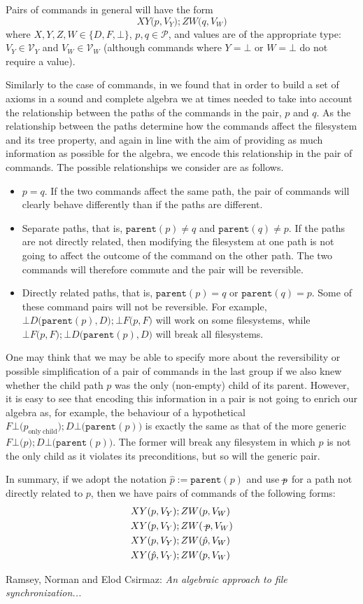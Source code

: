 \documentclass[12pt]{article}
\newcommand{\setvx}[1]{\mathcal{V}_{#1}}
\newcommand{\setp}{\mathcal{P}}
\newcommand{\empt}{\bot}
\newcommand{\parent}{\mathtt{parent}}
\newcommand{\pp}{\hat{p}} %
\newcommand{\np}{\mathrel{\ooalign{$p$\cr\hidewidth\hbox{$-$}\cr}}} %
\newcommand{\fscommand}[2]{{#1#2}}
\newcommand{\cbf}{\fscommand{\empt{F}}}
\newcommand{\cbd}{\fscommand{\empt{D}}}
\newcommand{\cfb}{\fscommand{F\empt}}
\newcommand{\cdb}{\fscommand{D\empt}}
\newcommand{\cxy}{\fscommand{XY}}
\newcommand{\czw}{\fscommand{ZW}}
\begin{document}
Pairs of commands in general will have the form
\[ \cxy(p,V_Y); \czw(q,V_W) \]
where $X,Y,Z,W\in\{D,F,\empt\}$, $p,q\in\setp$, and values are of the appropriate type: 
$V_Y\in\setvx{Y}$ and $V_W\in\setvx{W}$
(although commands where $Y=\empt$ or $W=\empt$ do not require a value).

Similarly to the case of commands, in \cite{NREC:alg} we found that in order to build
a set of axioms in a sound and complete algebra we at times needed to take into account
the relationship between the paths of the commands in the pair, $p$ and $q$.
As the relationship between the paths determine how the commands affect the filesystem
and its tree property, 
and again in line with the aim of providing as much information as possible for the algebra,
we encode this relationship in the pair of commands. The possible relationships we
consider are as follows.

\begin{itemize}
\item $p=q$. If the two commands affect the same path, the pair of commands
will clearly behave differently than if the paths are different.
\item Separate paths, that is, $\parent(p)\neq q$ and $\parent(q)\neq p$. If the paths
are not directly related, then modifying the filesystem at one path is not going
to affect the outcome of the command on the other path.
The two commands will therefore commute and the pair will be reversible.
\item Directly related paths, that is, $\parent(p)=q$ or $\parent(q)=p$.
Some of these command pairs will not be reversible.
For example, $\cbd(\parent(p),D);\cbf(p,F)$ will work on some filesystems,
while $\cbf(p,F);\cbd(\parent(p),D)$ will break all filesystems.
\end{itemize}

One may think that we may be able to specify more about the reversibility
or possible simplification of a pair of commands in the last group if we also
knew whether the child path $p$ was the only (non-empty) child of its parent.
However, it is easy to see that encoding this information in a pair
is not going to enrich our algebra as, for example,
the behaviour of a hypothetical $\cfb(p_{\mathrm{only\ child}}); \cdb(\parent(p))$
is exactly the same as that of the more generic
$\cfb(p); \cdb(\parent(p))$. The former will break any filesystem in which
$p$ is not the only child as it violates its preconditions, but so will
the generic pair.

In summary, if we adopt the notation $\pp := \parent(p)$ and use $\np$ for a path not directly related to $p$,
then we have pairs of commands
of the following forms:
\begin{align*}
\cxy(p,V_Y)&; \czw(p,V_W) \\
\cxy(p,V_Y)&; \czw(\np,V_W) \\
\cxy(p,V_Y)&; \czw(\pp,V_W) \\
\cxy(\pp,V_Y)&; \czw(p,V_W)
\end{align*}



\begin{thebibliography}{99}

 Ramsey, Norman and Elod Csirmaz: {\it An algebraic approach to
file synchronization...}

\end{thebibliography}
\end{document}
